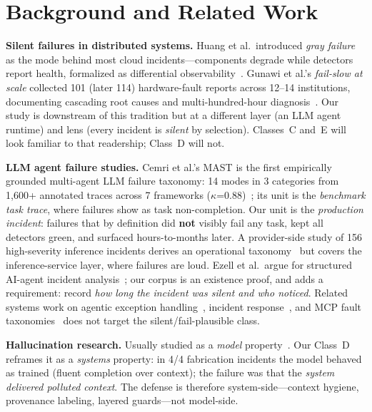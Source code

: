 \documentclass[conference]{IEEEtran}
\begin{document}
\section{Background and Related Work}
\textbf{Silent failures in distributed systems.} Huang et al.\ introduced
\emph{gray failure} as the mode behind most cloud incidents---components
degrade while detectors report health, formalized as differential
observability~\cite{huang2017gray}. Gunawi et al.'s \emph{fail-slow at
scale} collected 101 (later 114) hardware-fault reports across 12--14
institutions, documenting cascading root causes and multi-hundred-hour
diagnosis~\cite{gunawi2018failslow}. Our study is downstream of this
tradition but at a different layer (an LLM agent runtime) and lens (every
incident is \emph{silent} by selection). Classes~C and~E will look
familiar to that readership; Class~D will not.

\textbf{LLM agent failure studies.} Cemri et al.'s MAST is the first
empirically grounded multi-agent LLM failure taxonomy: 14 modes in 3
categories from 1{,}600+ annotated traces across 7 frameworks
($\kappa$=0.88)~\cite{cemri2025mast}; its unit is the \emph{benchmark task
trace}, where failures show as task non-completion. Our unit is the
\emph{production incident}: failures that by definition did \textbf{not}
visibly fail any task, kept all detectors green, and surfaced
hours-to-months later. A provider-side study of 156 high-severity
inference incidents derives an operational taxonomy~%
\cite{ranganathan2025inference} but covers the inference-service layer,
where failures are loud. Ezell et al.\ argue for structured AI-agent
incident analysis~\cite{ezell2025incident}; our corpus is an existence
proof, and adds a requirement: record \emph{how long the incident was
silent and who noticed}. Related systems work on agentic exception
handling~\cite{zhou2025shielda}, incident response~\cite{xiao2026air}, and
MCP fault taxonomies~\cite{taraghi2026mcp,owotogbe2026mcpruntime} does not
target the silent/fail-plausible class.

\textbf{Hallucination research.} Usually studied as a \emph{model}
property~\cite{huang2023hallucination}. Our Class~D reframes it as a
\emph{systems} property: in 4/4 fabrication incidents the model behaved as
trained (fluent completion over context); the failure was that the
\emph{system delivered polluted context}. The defense is therefore
system-side---context hygiene, provenance labeling, layered guards---not
model-side.
\end{document}
